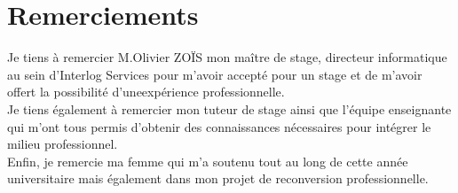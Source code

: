 \section*{Remerciements}
\noindent
{}
{}


Je tiens à remercier M.Olivier ZOÏS mon maître de stage, directeur informatique 
au sein d'Interlog Services pour m’avoir accepté pour un stage et de m’avoir
offert la possibilité d’uneexpérience professionnelle.\\


Je tiens également à remercier mon tuteur de stage ainsi que l’équipe enseignante qui
m’ont tous permis d’obtenir des connaissances nécessaires pour intégrer le milieu
professionnel.\\


Enfin, je remercie ma femme qui m’a soutenu tout au long de cette année universitaire
mais également dans mon projet de reconversion professionnelle.

\newpage



